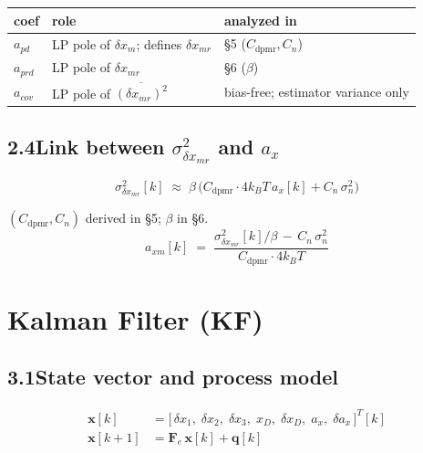 \documentclass[11pt]{article}
\newcommand{\T}{^{T}}
\newcommand{\kB}{k_B}
\begin{document}
\begin{center}
\begin{tabular}{l l l}
\hline
coef & role & analyzed in \\
\hline
$a_{pd}$  & LP pole of $\delta x_m$; defines $\delta x_{mr}$ & \S5 ($C_{\mathrm{dpmr}}, C_n$) \\
$a_{prd}$ & LP pole of $\delta x_{mr}$                       & \S6 ($\beta$) \\
$a_{cov}$ & LP pole of $\overline{(\delta x_{mr})^{2}}$      & bias-free; estimator variance only \\
\hline
\end{tabular}
\end{center}

\subsection*{2.4\quad Link between $\sigma^{2}_{\delta x_{mr}}$ and $a_x$}

\begin{equation}
\boxed{\;\;
\sigma^{2}_{\delta x_{mr}}[k] \;\approx\; \beta\,\bigl(C_{\mathrm{dpmr}}\cdot 4\kB T\,a_x[k] + C_{n}\,\sigma^{2}_n\bigr)
\;\;}
\end{equation}

\noindent $(C_{\mathrm{dpmr}}, C_n)$ derived in \S5; $\beta$ in \S6.
\begin{equation}
a_{xm}[k] \;=\; \frac{\sigma^{2}_{\delta x_{mr}}[k]/\beta \,-\, C_{n}\,\sigma^{2}_n}
                    {C_{\mathrm{dpmr}}\cdot 4\kB T}
\end{equation}

\section{Kalman Filter (KF)}

\subsection*{3.1\quad State vector and process model}

\begin{align}
\bm{x}[k]      &= \bigl[\,\delta x_1,\;\delta x_2,\;\delta x_3,\;
  x_D,\;\delta x_D,\;a_x,\;\delta a_x\,\bigr]\T[k] \\[2pt]
\bm{x}[k\!+\!1] &= \bm{F}_{e}\,\bm{x}[k] + \bm{q}[k]
\end{align}
\end{document}
